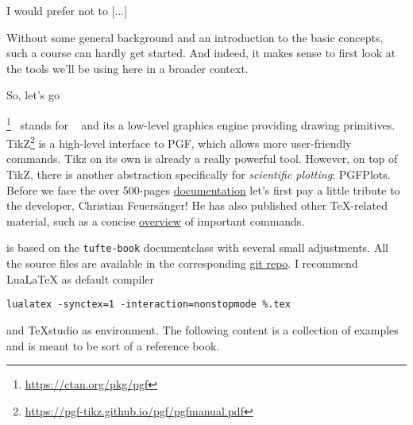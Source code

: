 \epigraph{I would prefer not to [...]}{}

Without some general background and an introduction to the basic concepts, such a course can hardly get started. And indeed, it makes sense to first look at the tools we’ll be using here in a broader context. 

So, let's go 

 \mypgf\footnote{\url{https://ctan.org/pkg/pgf}}~ stands for \mypgflong~ and its a low-level graphics engine providing drawing primitives. TikZ\footnote{\url{https://pgf-tikz.github.io/pgf/pgfmanual.pdf}} is a high-level interface to PGF, which allows more user-friendly commands. Tikz on its own is already a really powerful tool. However, on top of TikZ, there is another abstraction specifically for \emph{scientific plotting}: PGFPlots. Before we face the over 500-pages \href{https://pgfplots.sourceforge.net/pgfplots.pdf}{documentation} let’s first pay a little tribute to the developer, Christian Feuersänger! He has also published other TeX-related material, such as a concise \href{https://ins.uni-bonn.de/media/public/staff/feuersaenger/MeineKurzReferenz.pdf}{overview} of important commands.

 is based on the \verb|tufte-book| documentclass with several small adjustments. All the source files are available in the corresponding \href{https://github.com/cmab92/TeXamples}{git repo}. I recommend LuaLaTeX as default compiler

{\centering \verb|lualatex -synctex=1 -interaction=nonstopmode %.tex| \par}

and TeXstudio as environment. The following content is a collection of examples and is meant to be sort of a reference book. 

